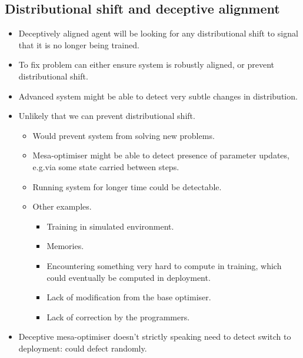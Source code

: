 \subsection{Distributional shift and deceptive alignment}

\begin{itemize}
    \item Deceptively aligned agent will be looking for any distributional shift to signal that it is no longer being trained.
    \item To fix problem can either ensure system is robustly aligned, or prevent distributional shift.
    \item Advanced system might be able to detect very subtle changes in distribution.
    \item Unlikely that we can prevent distributional shift.
    \begin{itemize}
        \item Would prevent system from solving new problems.
        \item Mesa-optimiser might be able to detect presence of parameter updates, e.g.\@ via some state carried between steps.
        \item Running system for longer time could be detectable.
        \item Other examples.
        \begin{itemize}
            \item Training in simulated environment.
            \item Memories.
            \item Encountering something very hard to compute in training, which could eventually be computed in deployment.
            \item Lack of modification from the base optimiser.
            \item Lack of correction by the programmers.
        \end{itemize}
    \end{itemize}
    \item Deceptive mesa-optimiser doesn't strictly speaking need to detect switch to deployment: could defect randomly.
\end{itemize}